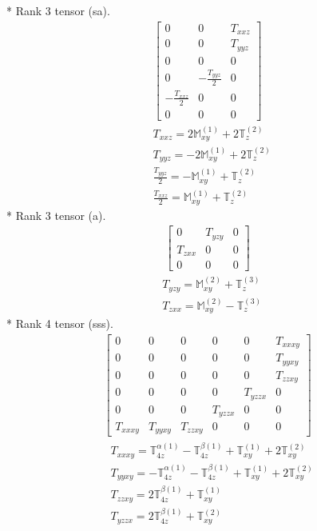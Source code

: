 \documentclass[fleqn,8pt,landscape]{jsarticle}
\begin{document}
* Rank 3 tensor (sa).
\begin{align*}
\begin{bmatrix} 0 & 0 & T_{xxz} \\ 0 & 0 & T_{yyz} \\ 0 & 0 & 0 \\ 0 & - \frac{T_{yyz}}{2} & 0 \\ - \frac{T_{xxz}}{2} & 0 & 0 \\ 0 & 0 & 0 \end{bmatrix}
\end{align*}
\begin{align*}
& T_{xxz} = 2 \mathbb{M}_{xy}^{(1)} + 2 \mathbb{T}_{z}^{(2)} \\
& T_{yyz} = - 2 \mathbb{M}_{xy}^{(1)} + 2 \mathbb{T}_{z}^{(2)} \\
& \frac{T_{yyz}}{2} = - \mathbb{M}_{xy}^{(1)} + \mathbb{T}_{z}^{(2)} \\
& \frac{T_{xxz}}{2} = \mathbb{M}_{xy}^{(1)} + \mathbb{T}_{z}^{(2)}
\end{align*}
* Rank 3 tensor (a).
\begin{align*}
\begin{bmatrix} 0 & T_{yzy} & 0 \\ T_{zxx} & 0 & 0 \\ 0 & 0 & 0 \end{bmatrix}
\end{align*}
\begin{align*}
& T_{yzy} = \mathbb{M}_{xy}^{(2)} + \mathbb{T}_{z}^{(3)} \\
& T_{zxx} = \mathbb{M}_{xy}^{(2)} - \mathbb{T}_{z}^{(3)}
\end{align*}
* Rank 4 tensor (sss).
\begin{align*}
\begin{bmatrix} 0 & 0 & 0 & 0 & 0 & T_{xxxy} \\ 0 & 0 & 0 & 0 & 0 & T_{yyxy} \\ 0 & 0 & 0 & 0 & 0 & T_{zzxy} \\ 0 & 0 & 0 & 0 & T_{yzzx} & 0 \\ 0 & 0 & 0 & T_{yzzx} & 0 & 0 \\ T_{xxxy} & T_{yyxy} & T_{zzxy} & 0 & 0 & 0 \end{bmatrix}
\end{align*}
\begin{align*}
& T_{xxxy} = \mathbb{T}_{4z}^{\alpha(1)} - \mathbb{T}_{4z}^{\beta(1)} + \mathbb{T}_{xy}^{(1)} + 2 \mathbb{T}_{xy}^{(2)} \\
& T_{yyxy} = - \mathbb{T}_{4z}^{\alpha(1)} - \mathbb{T}_{4z}^{\beta(1)} + \mathbb{T}_{xy}^{(1)} + 2 \mathbb{T}_{xy}^{(2)} \\
& T_{zzxy} = 2 \mathbb{T}_{4z}^{\beta(1)} + \mathbb{T}_{xy}^{(1)} \\
& T_{yzzx} = 2 \mathbb{T}_{4z}^{\beta(1)} + \mathbb{T}_{xy}^{(2)}
\end{align*}
\end{document}
